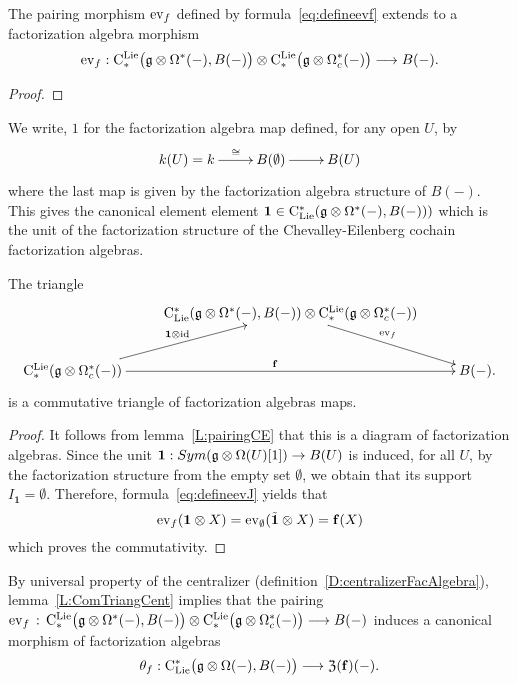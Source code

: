\documentclass[11pt]{amsart}
\numberwithin{equation}{section}
\begin{document}
\begin{lmm}\label{L:pairingCE}
 The pairing morphism ${\rm ev}_f$ defined by formula~\eqref{eq:defineevf} extends to a factorization algebra morphism
 \[{\rm ev}_f:  {\rm C}^{\rm Lie}_*\big(\mathfrak g \otimes \Omega^* (-), B(-)\big) \otimes {\rm C}^{\rm Lie}_*\big(\mathfrak g \otimes \Omega_c^* (-)\big) 
 \longrightarrow B(-).\]
\end{lmm}
\begin{proof}
 
\end{proof}
We write, $1$ for the factorization algebra map defined, for any open $U$, by 
\[\xymatrix{ k(U)=k  \ar[r]^{\quad \cong}& 
B(\emptyset) \ar[r] & B(U)  } 
 \] where the last map is given by the factorization algebra structure of $B(-)$. This gives the canonical element element $\mathbf{1}\in {\rm C}_{\rm Lie}^*(\mathfrak g\otimes \Omega^*(-), B(-)) )$ which is the unit of the factorization structure of 
 the Chevalley-Eilenberg cochain factorization algebras. 
 
\begin{lmm}\label{L:ComTriangCent} The triangle 
 $$ \xymatrix{
& \clies ( \fg\otimes \Omega^* (-), B(-)) \otimes \cliels(\fg\otimes \Omega^*_c  (-) )
\ar[dr]^{\ev_f} & \\
\cliels(\fg\otimes \Omega^*_c (-)) \ar[ur]^{\mathbf{1} \otimes \id} \ar[rr]^{\mathbf{f}}  & &  B(-).}
 $$
is a commutative triangle of factorization algebras maps.
\end{lmm}
\begin{proof}
 It follows from lemma~\ref{L:pairingCE} that this is a diagram of factorization algebras. Since the unit $\mathbf{1}:Sym(\mathfrak g \otimes \Omega(U)[1]) \to B(U)$ is induced, for all $U$, by the factorization structure from the empty set $\emptyset$, we obtain that its support $I_{\mathbf{1}}=\emptyset$. 
 Therefore, formula~\eqref{eq:defineevJ} yields that 
 \[{\rm ev}_{f} (\mathbf{1}\otimes X) = {\rm ev}_{\emptyset}(\tilde{\mathbf{1}}\otimes X) 
 = \mathbf{f}(X)\] which proves the commutativity.
\end{proof}



By universal property of the centralizer (definition~\ref{D:centralizerFacAlgebra}), lemma~\ref{L:ComTriangCent} implies that the pairing ${\rm ev}_f \,:\,{\rm C}^{\rm Lie}_*\big(\mathfrak g \otimes \Omega^* (-), B(-)\big) \otimes {\rm C}^{\rm Lie}_*\big(\mathfrak g \otimes \Omega_c^* (-)\big) 
 \longrightarrow B(-)$ induces 
a canonical morphism of factorization algebras
\begin{equation}\label{eq:canonicaltocenter}
\theta_f: {\rm C}_{\rm Lie}^*\big(\mathfrak g\otimes \Omega (-), B(-) \big) \longrightarrow  {\frak Z}(\mathbf{f})(-). 
\end{equation}
\end{document}
